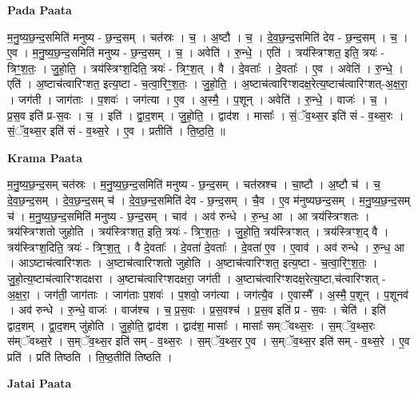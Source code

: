 \documentclass[17pt]{extarticle}
\begin{document}
\textbf{Pada Paata} \newline

म॒नु॒ष्य॒छ॒न्द॒समिति॑ मनुष्य - छ॒न्द॒सम् । चत॑स्रः । च॒ । अ॒ष्टौ । च॒ । दे॒व॒छ॒न्द॒समिति॑ देव - छ॒न्द॒सम् । च॒ । ए॒व । म॒नु॒ष्य॒छ॒न्द॒समिति॑ मनुष्य - छ॒न्द॒सम् । च॒ । अवेति॑ । रु॒न्धे॒ । एति॑ । त्रय॑स्त्रिꣳशत॒ इति॒ त्रयः॑ - त्रिꣳ॒॒श॒तः॒ । जु॒हो॒ति॒ । त्रय॑स्त्रिꣳश॒दिति॒ त्रयः॑ - त्रिꣳ॒॒श॒त् । वै । दे॒वताः᳚ । दे॒वताः᳚ । ए॒व । अवेति॑ । रु॒न्धे॒ । एति॑ । अ॒ष्टाच॑त्वारिꣳशत॒ इत्य॒ष्टा - च॒त्वा॒रिꣳ॒॒श॒तः॒ । जु॒हो॒ति॒ । अ॒ष्टाच॑त्वारिꣳशदक्ष॒रेत्य॒ष्टाच॑त्वारिꣳशत्-अ॒क्ष॒रा॒ । जग॑ती । जाग॑ताः । प॒शवः॑ । जग॑त्या । ए॒व । अ॒स्मै॒ । प॒शून् । अवेति॑ । रु॒न्धे॒ । वाजः॑ । च॒ । प्र॒स॒व इति॑ प्र-स॒वः । च॒ । इति॑ । द्वा॒द॒शम् । जु॒हो॒ति॒ । द्वाद॑श । मासाः᳚ । सं॒ॅव॒थ्स॒र इति॑ सं - व॒थ्स॒रः । सं॒ॅव॒थ्स॒र इति॑ सं - व॒थ्स॒रे । ए॒व । प्रतीति॑ । ति॒ष्ठ॒ति॒ ॥  \newline


\textbf{Krama Paata} \newline

म॒नु॒ष्य॒छ॒न्द॒सम् चत॑स्रः । म॒नु॒ष्य॒छ॒न्द॒समिति॑ मनुष्य - छ॒न्द॒सम् । चत॑स्रश्च । चा॒ष्टौ । अ॒ष्टौ च॑ । च॒ दे॒व॒छ॒न्द॒सम् । दे॒व॒छ॒न्द॒सम् च॑ । दे॒व॒छ॒न्द॒समिति॑ देव - छ॒न्द॒सम् । चै॒व । ए॒व म॑नुष्यछन्द॒सम् । म॒नु॒ष्य॒छ॒न्द॒सम् च॑ । म॒नु॒ष्य॒छ॒न्द॒समिति॑ मनुष्य - छ॒न्द॒सम् । चाव॑ । अव॑ रुन्धे । रु॒न्ध॒ आ । आ त्रय॑स्त्रिꣳशतः । त्रय॑स्त्रिꣳशतो जुहोति । त्रय॑स्त्रिꣳशत॒ इति॒ त्रयः॑ - त्रिꣳ॒॒श॒तः॒ । जु॒हो॒ति॒ त्रय॑स्त्रिꣳशत् । त्रय॑स्त्रिꣳश॒द् वै । त्रय॑स्त्रिꣳश॒दिति॒ त्रयः॑ - त्रिꣳ॒॒श॒त्॒ । वै दे॒वताः᳚ । दे॒वता॑ दे॒वताः᳚ । दे॒वता॑ ए॒व । ए॒वाव॑ । अव॑ रुन्धे । रु॒न्ध॒ आ । आऽष्टाच॑त्वारिꣳशतः । अ॒ष्टाच॑त्वारिꣳशतो जुहोति । अ॒ष्टाच॑त्वारिꣳशत॒ इत्य॒ष्टा - च॒त्वा॒रिꣳ॒॒श॒तः॒ । जु॒हो॒त्य॒ष्टाच॑त्वारिꣳशदक्षरा । अ॒ष्टाच॑त्वारिꣳशदक्षरा॒ जग॑ती । अ॒ष्टाच॑त्वारिꣳशदक्ष॒रेत्य॒ष्टा,च॑त्वारिꣳशत् - अ॒क्ष॒रा॒ । जग॑ती॒ जाग॑ताः । जाग॑ताः प॒शवः॑ । प॒शवो॒ जग॑त्या । जग॑त्यै॒व । ए॒वास्मै᳚ । अ॒स्मै॒ प॒शून् । प॒शूनव॑ । अव॑ रुन्धे । रु॒न्धे॒ वाजः॑ । वाज॑श्च । च॒ प्र॒स॒वः । प्र॒स॒वश्च॑ । प्र॒स॒व इति॑ प्र - स॒वः । चेति॑ । इति॑ द्वाद॒शम् । द्वा॒द॒शम् जु॑होति । जु॒हो॒ति॒ द्वाद॑श । द्वाद॑श॒ मासाः᳚ । मासाः᳚ सम्ॅवथ्स॒रः । स॒म्ॅव॒थ्स॒रः स॑म्ॅवथ्स॒रे । स॒म्ॅव॒थ्स॒र इति॑ सम् - व॒थ्स॒रः । स॒म्ॅव॒थ्स॒र ए॒व । स॒म्ॅव॒थ्स॒र इति॑ सम् - व॒थ्स॒रे । ए॒व प्रति॑ । प्रति॑ तिष्ठति । ति॒ष्ठ॒तीति॑ तिष्ठति । \newline

\textbf{Jatai Paata} \newline
\end{document}
